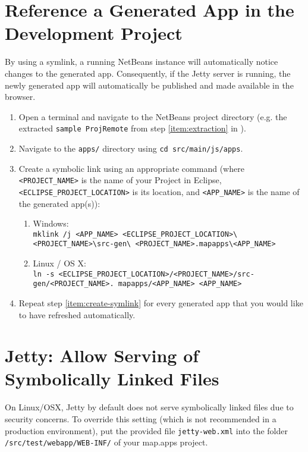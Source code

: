 
\section{Reference a Generated App in the Development Project}
\label{subsec:link-apps}

By using a symlink, a running NetBeans instance will automatically notice changes to the generated app. Consequently, if the Jetty server is running, the newly generated app will automatically be published and made available in the browser.

\begin{enumerate}
\item Open a terminal and navigate to the \mapapps NetBeans project directory (e.g. the extracted \lstinline[language=Simple]|sample ProjRemote| from step \ref{item:extraction} in ).
\item Navigate to the \lstinline[language=Simple]|apps/| directory using \lstinline[language=Simple]|cd src/main/js/apps|.
\item Create a symbolic link using an appropriate command (where \lstinline[language=Simple]|<PROJECT_NAME>| is the name of your \MD Project in Eclipse, \lstinline[language=Simple]|<ECLIPSE_PROJECT_LOCATION>| is its location, and \lstinline[language=Simple]|<APP_NAME>| is the name of the generated app(s)): \label{item:create-symlink}
	\begin{enumerate}
	\item Windows:\\
	\lstinline|mklink /j <APP_NAME> <ECLIPSE_PROJECT_LOCATION>\<PROJECT_NAME>\src-gen\ <PROJECT_NAME>.mapapps\<APP_NAME>|
	
	\item Linux / OS X: \\
	\lstinline|ln -s <ECLIPSE_PROJECT_LOCATION>/<PROJECT_NAME>/src-gen/<PROJECT_NAME>. mapapps/<APP_NAME> <APP_NAME>|
	\end{enumerate}
	
\item Repeat step \ref{item:create-symlink} for every generated app that you would like to have refreshed automatically.
\end{enumerate}


\section{Jetty: Allow Serving of Symbolically Linked Files}
\label{subsec:jetty-symbolic-files}

On Linux/OSX, Jetty by default does not serve symbolically linked files due to security concerns.
To override this setting (which is not recommended in a production environment), put the provided file \lstinline[language=Simple]|jetty-web.xml| into the folder \lstinline[language=Simple]|/src/test/webapp/WEB-INF/| of your map.apps project.


